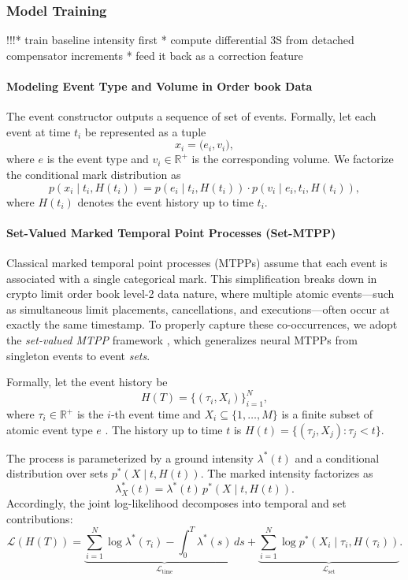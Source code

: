 \subsubsection{Model Training}

!!!* train baseline intensity first
* compute differential 3S from detached compensator increments
* feed it back as a correction feature

\paragraph{Modeling Event Type and Volume in Order book Data}

The event constructor outputs a sequence of set of events. Formally, let each event at time $t_i$ be represented as a tuple
\[
x_i = \big(e_i, v_i \big),
\]
where $e$ is the event type and $v_i \in \mathbb{R}^+$ is the corresponding volume. We factorize the conditional mark distribution as
\begin{equation}
p(x_i \mid t_i, H(t_i)) 
= p(e_i \mid t_i, H(t_i)) \cdot p(v_i \mid e_i, t_i, H(t_i)),
\label{eq:factorization}
\end{equation}
where $H(t_i)$ denotes the event history up to time $t_i$.  

\paragraph{Set-Valued Marked Temporal Point Processes (Set-MTPP)}
\label{subsec:set-mtpp}

Classical marked temporal point processes (MTPPs) assume that each event is associated with a single categorical mark. This simplification breaks down in crypto limit order book level-2 data nature, where multiple atomic events---such as simultaneous limit placements, cancellations, and executions---often occur at exactly the same timestamp. To properly capture these co-occurrences, we adopt the \emph{set-valued MTPP} framework \cite{Chang2023}, which generalizes neural MTPPs from singleton events to event \emph{sets}.

Formally, let the event history be
\[
H(T) = \{(\tau_i, X_i)\}_{i=1}^N,
\]
where $\tau_i \in \mathbb{R}^+$ is the $i$-th event time and $X_i \subseteq \{1,\dots,M\}$ is a finite subset of atomic event type $e$ . The history up to time $t$ is $H(t) = \{(\tau_j, X_j): \tau_j < t\}$.  

The process is parameterized by a ground intensity $\lambda^*(t)$ and a conditional distribution over sets $p^*(X \mid t,H(t))$. The marked intensity factorizes as
\[
\lambda^*_X(t) = \lambda^*(t)\,p^*(X \mid t, H(t)).
\]
Accordingly, the joint log-likelihood decomposes into temporal and set contributions:
\[
\mathcal{L}(H(T)) =
\underbrace{\sum_{i=1}^N \log \lambda^*(\tau_i) - \int_0^T \lambda^*(s)\,ds}_{\mathcal{L}_{\text{time}}}
+
\underbrace{\sum_{i=1}^N \log p^*(X_i \mid \tau_i, H(\tau_i))}_{\mathcal{L}_{\text{set}}}.
\]

